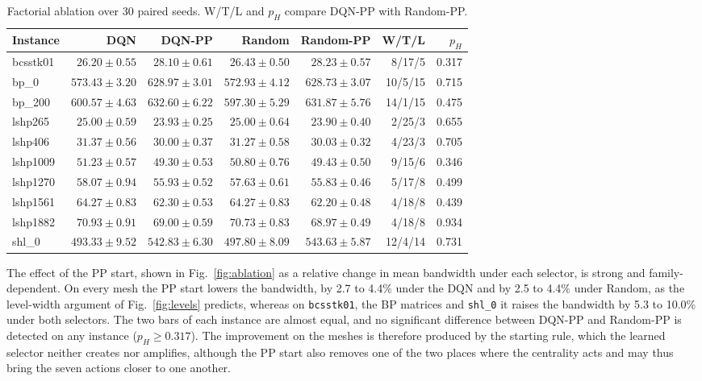 \documentclass[runningheads]{llncs}
\begin{document}
\begin{table}[!tb]
\centering
\caption{Factorial ablation over 30 paired seeds. W/T/L and $p_H$ compare DQN-PP with Random-PP.}
\label{tab:grid}
\scriptsize
\setlength{\tabcolsep}{4pt}
\begin{tabular}{lrrrrrr}
\toprule
Instance & DQN & DQN-PP & Random & Random-PP & W/T/L & $p_H$\\
\midrule
bcsstk01 & $26.20\pm0.55$ & $28.10\pm0.61$ & $26.43\pm0.50$ & $28.23\pm0.57$ & 8/17/5 & 0.317\\
bp\_0 & $573.43\pm3.20$ & $628.97\pm3.01$ & $572.93\pm4.12$ & $628.73\pm3.07$ & 10/5/15 & 0.715\\
bp\_200 & $600.57\pm4.63$ & $632.60\pm6.22$ & $597.30\pm5.29$ & $631.87\pm5.76$ & 14/1/15 & 0.475\\
lshp265 & $25.00\pm0.59$ & $\mathbf{23.93\pm0.25}$ & $25.00\pm0.64$ & $\mathbf{23.90\pm0.40}$ & 2/25/3 & 0.655\\
lshp406 & $31.37\pm0.56$ & $\mathbf{30.00\pm0.37}$ & $31.27\pm0.58$ & $\mathbf{30.03\pm0.32}$ & 4/23/3 & 0.705\\
lshp1009 & $51.23\pm0.57$ & $\mathbf{49.30\pm0.53}$ & $50.80\pm0.76$ & $\mathbf{49.43\pm0.50}$ & 9/15/6 & 0.346\\
lshp1270 & $58.07\pm0.94$ & $\mathbf{55.93\pm0.52}$ & $57.63\pm0.61$ & $\mathbf{55.83\pm0.46}$ & 5/17/8 & 0.499\\
lshp1561 & $64.27\pm0.83$ & $\mathbf{62.30\pm0.53}$ & $64.27\pm0.83$ & $\mathbf{62.20\pm0.48}$ & 4/18/8 & 0.439\\
lshp1882 & $70.93\pm0.91$ & $\mathbf{69.00\pm0.59}$ & $70.73\pm0.83$ & $\mathbf{68.97\pm0.49}$ & 4/18/8 & 0.934\\
shl\_0 & $493.33\pm9.52$ & $542.83\pm6.30$ & $497.80\pm8.09$ & $543.63\pm5.87$ & 12/4/14 & 0.731\\
\bottomrule
\end{tabular}
\end{table}

The effect of the PP start, shown in Fig.~\ref{fig:ablation} as a relative change in mean bandwidth under each selector, is strong and family-dependent. On every mesh the PP start lowers the bandwidth, by 2.7 to 4.4\% under the DQN and by 2.5 to 4.4\% under Random, as the level-width argument of Fig.~\ref{fig:levels} predicts, whereas on \texttt{bcsstk01}, the BP matrices and \texttt{shl\_0} it raises the bandwidth by 5.3 to 10.0\% under both selectors. The two bars of each instance are almost equal, and no significant difference between DQN-PP and Random-PP is detected on any instance ($p_H\geq0.317$). The improvement on the meshes is therefore produced by the starting rule, which the learned selector neither creates nor amplifies, although the PP start also removes one of the two places where the centrality acts and may thus bring the seven actions closer to one another.
\end{document}
